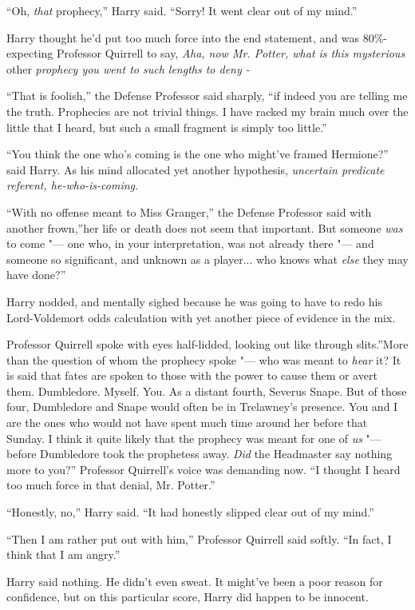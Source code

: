 ``Oh, \emph{that} prophecy,'' Harry said. ``Sorry! It went clear out of
my mind.''

Harry thought he'd put too much force into the end statement, and was
80\%-expecting Professor Quirrell to say, \emph{Aha, now Mr. Potter,
what is this mysterious} other \emph{prophecy you went to such lengths
to deny -}

``That is foolish,'' the Defense Professor said sharply, ``if indeed you
are telling me the truth. Prophecies are not trivial things. I have
racked my brain much over the little that I heard, but such a small
fragment is simply too little.''

``You think the one who's coming is the one who might've framed
Hermione?'' said Harry. As his mind allocated yet another hypothesis,
\emph{uncertain predicate referent, he-who-is-coming.}

``With no offense meant to Miss Granger,'' the Defense Professor said
with another frown,''her life or death does not seem that important. But
someone \emph{was} to come "--- one who, in your interpretation, was not
already there "--- and someone so significant, and unknown as a
player... who knows what \emph{else} they may have done?''

Harry nodded, and mentally sighed because he was going to have to redo
his Lord-Voldemort odds calculation with yet another piece of evidence
in the mix.

Professor Quirrell spoke with eyes half-lidded, looking out like through
slits.''More than the question of whom the prophecy spoke "--- who was
meant to \emph{hear} it? It is said that fates are spoken to those with
the power to cause them or avert them. Dumbledore. Myself. You. As a
distant fourth, Severus Snape. But of those four, Dumbledore and Snape
would often be in Trelawney's presence. You and I are the ones who would
not have spent much time around her before that Sunday. I think it quite
likely that the prophecy was meant for one of \emph{us} "--- before
Dumbledore took the prophetess away. \emph{Did} the Headmaster say
nothing more to you?'' Professor Quirrell's voice was demanding now. ``I
thought I heard too much force in that denial, Mr. Potter.''

``Honestly, no,'' Harry said. ``It had honestly slipped clear out of my
mind.''

``Then I am rather put out with him,'' Professor Quirrell said softly.
``In fact, I think that I am angry.''

Harry said nothing. He didn't even sweat. It might've been a poor reason
for confidence, but on this particular score, Harry did happen to be
innocent.

